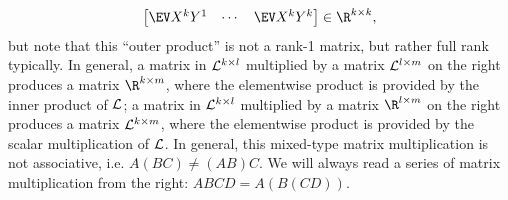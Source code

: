\documentclass[main.tex]{subfiles}
\begin{document}
\begin{defn}
\begin{align*}
\begin{bmatrix}
    \EV X^k Y^1 & \cdots & \EV X^k Y^k
  \end{bmatrix} \in \R^{k\times k},
\end{align*}
but note that this ``outer product'' is not a rank-1 matrix, but rather full rank typically.
In general, a matrix in $\mathcal{L}^{k \times l}$ multiplied by a matrix $\mathcal{L}^{l \times m}$ on the right produces a matrix $\R^{k \times m}$, where the elementwise product is provided by the inner product of $\mathcal{L}$;
a matrix in $\mathcal{L}^{k \times l}$ multiplied by a matrix $\R^{l \times m}$ on the right produces a matrix $\mathcal{L}^{k \times m}$, where the elementwise product is provided by the scalar multiplication of $\mathcal{L}$.
In general, this mixed-type matrix multiplication is not associative, i.e. $A(BC) \ne (AB)C$.
We will always read a series of matrix multiplication from the right: $ABCD = A(B(CD))$.

\end{defn}

\newcommand{\phz}{\phantom{0}}
\newcommand{\sqmat}[1]{
    \begin{bmatrix}
    \phz
      &\phz
        &\phz\\
    \phz
      &#1
        &\phz\\
    \phz
      &\phz
        &\phz
    \end{bmatrix}}
\newcommand{\colmat}[1]{
    \begin{bmatrix}
    \phz\\
    #1\\
    \phz
    \end{bmatrix}}
\end{document}
